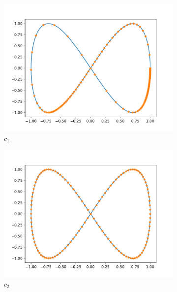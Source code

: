 \begin{figure}[t]\label{fig:curve_1}
    \begin{subfigure}[b]{0.5\textwidth}\label{fig:curve_1_c_1}
        \centering
        \includegraphics[width=\linewidth]{figures/curve_1/curve_c_1.pdf}
        \caption{\(c_1\)}
    \end{subfigure}
    \begin{subfigure}[b]{0.5\textwidth}\label{fig:curve_1_c_2}
        \centering
        \includegraphics[width=\linewidth]{figures/curve_1/curve_c_2.pdf}
        \caption{\(c_2\)}
    \end{subfigure}
    \begin{subfigure}[t]{0.5\textwidth}\label{fig:curve_1_q}

\end{subfigure}
\end{figure}
